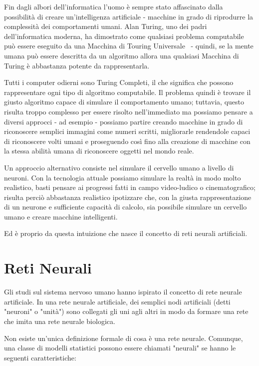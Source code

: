 \nocite{Lipton:2009}
Fin dagli albori dell'informatica l'uomo \`e sempre stato affascinato dalla possibilit\`a di creare un'intelligenza artificiale - macchine in grado di riprodurre la complessit\`a dei comportamenti umani.
Alan Turing, uno dei padri dell'informatica moderna, ha dimostrato come qualsiasi problema computabile pu\`o essere eseguito da una Macchina di Touring Universale~\cite{wiki:MacchinaTuring} - quindi, se la mente umana pu\`o essere descritta da un algoritmo allora una qualsiasi Macchina di Turing \`e abbastanza potente da rappresentarla.

Tutti i computer odierni sono Turing Completi, il che significa che possono rappresentare ogni tipo di algoritmo computabile.
Il problema quindi \`e trovare il giusto algoritmo capace di simulare il comportamento umano; tuttavia, questo risulta troppo complesso per essere risolto nell'immediato ma possiamo pensare a diversi approcci - ad esempio - possiamo partire creando macchine in grado di riconoscere semplici immagini come numeri scritti, migliorarle rendendole capaci di riconoscere volti umani e proseguendo cos\`i fino alla creazione di macchine con la stessa abilit\`a umana di riconoscere oggetti nel mondo reale.

Un approccio alternativo consiste nel simulare il cervello umano a livello di neuroni.
Con la tecnologia attuale possiamo simulare la realt\`a in modo molto realistico, basti pensare ai progressi fatti in campo video-ludico o cinematografico; risulta perci\`o abbastanza realistico ipotizzare che, con la giusta rappresentazione di un neurone e sufficiente capacit\`a di calcolo, sia possibile simulare un cervello umano e creare macchine intelligenti.

Ed \`e proprio da questa intuizione che nasce il concetto di reti neurali artificiali.

\section{Reti Neurali}
Gli studi sul sistema nervoso umano hanno ispirato il concetto di rete neurale artificiale.
In una rete neurale artificiale, dei semplici nodi artificiali (detti "neuroni" o "unit\`a") sono collegati gli uni agli altri in modo da formare una rete che imita una rete neurale biologica.

Non esiste un'unica definizione formale di cosa \`e una rete neurale.
Comunque, una classe di modelli statistici possono essere chiamati "neurali" se hanno le seguenti caratteristiche:

